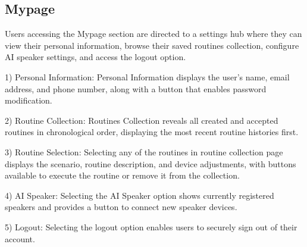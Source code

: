 \documentclass[conference]{IEEEtran}
\begin{document}
\subsection{Mypage}
\vspace{0.5em}
Users accessing the Mypage section are directed to a settings hub where they can view their personal information, browse their saved routines collection, configure AI speaker settings, and access the logout option.
\vspace{0.5em}

1) Personal Information: Personal Information displays the user's name, email address, and phone number, along with a button that enables password modification.
\vspace{0.5em}

2) Routine Collection: Routines Collection reveals all created and accepted routines in chronological order, displaying the most recent routine histories first. 
\vspace{0.5em}

3) Routine Selection: Selecting any of the routines in routine collection page displays the scenario, routine description, and device adjustments, with buttons available to execute the routine or remove it from the collection.
\vspace{0.5em}

4) AI Speaker: Selecting the AI Speaker option shows currently registered speakers and provides a button to connect new speaker devices.
\vspace{0.5em}

5) Logout: Selecting the logout option enables users to securely sign out of their account.
\end{document}
